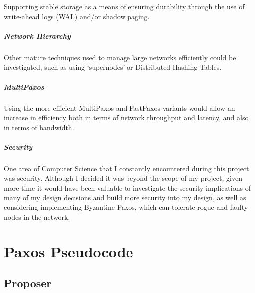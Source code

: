 \documentclass[12pt,twoside,notitlepage]{report}
\begin{document}
Supporting stable storage as a means of ensuring durability through the use of write-ahead logs
(WAL)\cite{burrows06} and/or shadow paging\cite{hitz94}.

\paragraph{Network Hierarchy}

Other mature techniques used to manage large networks efficiently could be investigated, such as
using `supernodes' or Distributed Hashing Tables.

\paragraph{MultiPaxos}

Using the more efficient MultiPaxos and FastPaxos variants would allow an
increase in efficiency both in terms of network throughput and latency, and also in terms of
bandwidth.

\paragraph{Security}

One area of Computer Science that I constantly encountered during this project was security.
Although I decided it was beyond the scope of my project, given more time it would have been
valuable to investigate the security implications of many of my design decisions and build more
security into my design, as well as considering implementing Byzantine Paxos, which can tolerate
rogue and faulty nodes in the network.

\cleardoublepage



\cleardoublepage

\appendix

\chapter{Paxos Pseudocode}

\section{Proposer}
\end{document}
